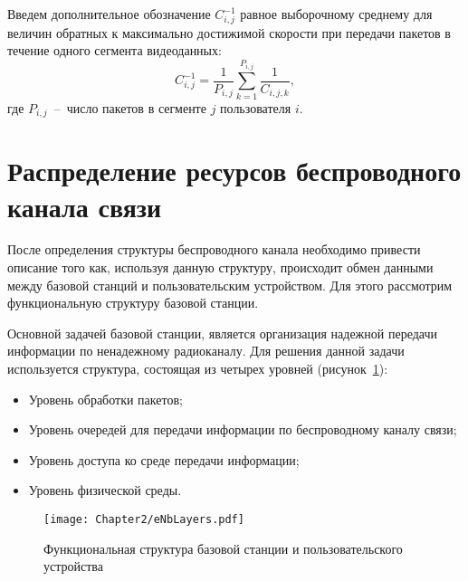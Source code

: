 
Введем дополнительное обозначение $C_{i,j}^{-1}$ равное выборочному среднему для величин обратных к максимально достижимой скорости при передачи пакетов в течение одного сегмента видеоданных:
\begin{equation}
\nonumber
C_{i,j}^{-1} = \frac{1}{P_{i,j}}\sum\limits_{k=1}^{P_{i,j}} \frac{1}{C_{i,j,k}},
\label{eq:ChannelConst_v1}
\end{equation}
где $P_{i,j}$~--~число пакетов в сегменте $j$ пользователя $i$.

\section{Распределение ресурсов беспроводного канала связи}
\label{chap2:Scheduler}

После определения структуры беспроводного канала необходимо привести описание того как, используя данную структуру, происходит обмен данными между базовой станций и пользовательским устройством. Для этого рассмотрим функциональную структуру базовой станции.

Основной задачей базовой станции, является организация надежной передачи информации по ненадежному радиоканалу. Для решения данной задачи используется структура, состоящая из четырех уровней (рисунок~\ref{fig:eNbLayers}):
\begin{itemize}
	\item Уровень обработки пакетов;
	\item Уровень очередей для передачи информации по беспроводному каналу связи;
	\item Уровень доступа ко среде передачи информации;
	\item Уровень физической среды.
\end{itemize}

\begin{figure}[htbp]
\begin{center}
\texttt{[image: Chapter2/eNbLayers.pdf]}
\caption{Функциональная структура базовой станции и пользовательского устройства}
\label{fig:eNbLayers}
\end{center}
\end{figure}

